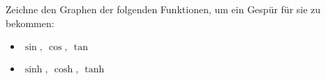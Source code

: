 \begin{exercise}
  Zeichne den Graphen der folgenden Funktionen, um ein Gespür für sie zu
  bekommen:
  \begin{itemize}
  \item $\sin, \ \cos, \ \tan$
  \item $\sinh, \ \cosh, \ \tanh$
  \end{itemize}
\end{exercise}
